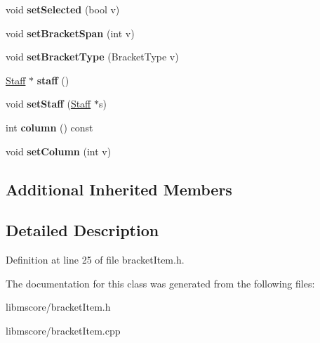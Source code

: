 \begin{DoxyCompactItemize}
\item 
\mbox{\label{class_ms_1_1_bracket_item_a07b72629f0391819f36ba8e20a15590d}} 
void {\bfseries set\+Selected} (bool v)
\item 
\mbox{\label{class_ms_1_1_bracket_item_a12e8409100d3937a2d7f69f86910cdbf}} 
void {\bfseries set\+Bracket\+Span} (int v)
\item 
\mbox{\label{class_ms_1_1_bracket_item_a87669c7c28f830ab5f9cc7be9426d192}} 
void {\bfseries set\+Bracket\+Type} (Bracket\+Type v)
\item 
\mbox{\label{class_ms_1_1_bracket_item_a15e0dddd6c299b45b129bb6a5924860b}} 
\hyperlink{class_ms_1_1_staff}{Staff} $\ast$ {\bfseries staff} ()
\item 
\mbox{\label{class_ms_1_1_bracket_item_a945a363e9979f291114bfc5cec2e13d6}} 
void {\bfseries set\+Staff} (\hyperlink{class_ms_1_1_staff}{Staff} $\ast$s)
\item 
\mbox{\label{class_ms_1_1_bracket_item_ae4af1c4a1824b967030e9049a602d6f2}} 
int {\bfseries column} () const
\item 
\mbox{\label{class_ms_1_1_bracket_item_aa8f40b3121ef5794c7302c600d8b894e}} 
void {\bfseries set\+Column} (int v)
\end{DoxyCompactItemize}
\subsection*{Additional Inherited Members}


\subsection{Detailed Description}


Definition at line 25 of file bracket\+Item.\+h.



The documentation for this class was generated from the following files\+:\begin{DoxyCompactItemize}
\item 
libmscore/bracket\+Item.\+h\item 
libmscore/bracket\+Item.\+cpp\end{DoxyCompactItemize}
